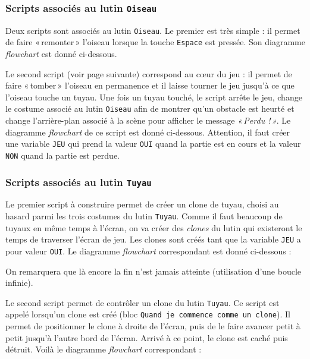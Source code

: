 \subsubsection{Scripts associés au lutin \texttt{Oiseau}}

Deux scripts sont associés au lutin \texttt{Oiseau}. Le premier est très simple : il permet de faire «\,remonter\,» l'oiseau lorsque la touche \texttt{Espace} est pressée. Son diagramme \emph{flowchart} est donné ci-dessous.


\vspace{3cm}

Le second script (voir page suivante) correspond au cœur du jeu : il permet de faire «\,tomber\,» l'oiseau en permanence et il laisse tourner le jeu jusqu'à ce que l'oiseau touche un tuyau. Une fois un tuyau touché, le script arrête le jeu, change le costume associé au lutin \texttt{Oiseau} afin de montrer qu'un obstacle est heurté et change l'arrière-plan associé à la scène pour afficher le message \emph{«\,Perdu !\,»}. Le diagramme \emph{flowchart} de ce script est donné ci-dessous. Attention, il faut créer une variable \texttt{JEU} qui prend la valeur \texttt{OUI} quand la partie est en cours et la valeur \texttt{NON} quand la partie est perdue.

\newpage 



\subsubsection{Scripts associés au lutin \texttt{Tuyau}}

Le premier script à construire permet de créer un clone de tuyau, choisi au hasard parmi les trois costumes du lutin \texttt{Tuyau}. Comme il faut beaucoup de tuyaux en même temps à l'écran, on va créer des \emph{clones} du lutin qui existeront le temps de traverser l'écran de jeu. Les clones sont créés tant que la variable \texttt{JEU} a pour valeur \texttt{OUI}. Le diagramme \emph{flowchart} correspondant est donné ci-dessous :



On remarquera que là encore la fin n'est jamais atteinte (utilisation d'une boucle infinie).

Le second script permet de contrôler un clone du lutin \texttt{Tuyau}. Ce script est appelé lorsqu'un clone est créé (bloc \texttt{Quand je commence comme un clone}). Il permet de positionner le clone à droite de l'écran, puis de le faire avancer petit à petit jusqu'à l'autre bord de l'écran. Arrivé à ce point, le clone est caché puis détruit. Voilà le diagramme \emph{flowchart} correspondant :

